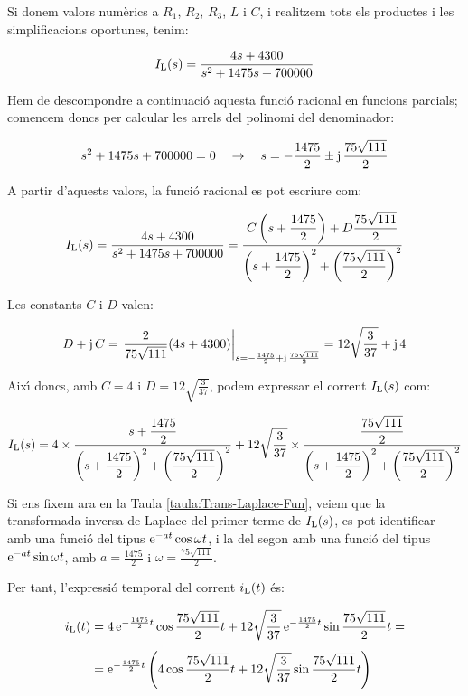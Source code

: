 \begin{exemple}
    Si donem valors num\`{e}rics a $R_1$, $R_2$, $R_3$, $L$ i $C$, i
    realitzem tots els productes i les  simplificacions oportunes,
    tenim:

    \[
    I_\mathrm{L}(s) = \frac{4 s+ 4300}{s^2 +1475 s + 700000}
    \]

    Hem de descompondre a continuaci\'{o} aquesta funci\'{o} racional en
    funcions parcials; comencem doncs per calcular les arrels del
    polinomi del denominador:

    \[
    s^2 +1475 s + 700000 = 0 \quad\rightarrow\quad s= -\frac{1475}{2}
    \pm \mathrm{j}\,\frac{75\sqrt{111}}{2}
    \]

    A partir d'aquests valors, la  funci\'{o} racional es pot escriure com:

    \[
        I_\mathrm{L}(s) =
        \frac{4 s+ 4300}{s^2 +1475 s + 700000} =
        \frac{C\left(s+\dfrac{1475}{2}\right)+D\dfrac{75\sqrt{111}}{2}}
        {\left(s+\dfrac{1475}{2}\right)^2+\left(\dfrac{75\sqrt{111}}{2}\right)^2}
    \]

    Les constants $C$ i $D$ valen:

    \[
    D + \mathrm{j}\,C = \left.\frac{2}{75\sqrt{111}}(4 s
    +4300)\right|_{s=-\frac{1475}{2} + \mathrm{j}\,\frac{75\sqrt{111}}{2}}=
    12\sqrt{\frac{3}{37}} +\mathrm{j}\,4
    \]

    Aix\'{\i} doncs, amb $C=4$ i $D=12\sqrt{\frac{3}{37}}$, podem expressar
    el corrent $I_\mathrm{L}(s)$ com:

    \[
        I_\mathrm{L}(s) = 4\times\frac{s+\dfrac{1475}{2}}
        {\left(s+\dfrac{1475}{2}\right)^2+\left(\dfrac{75\sqrt{111}}{2}\right)^2}
        + 12\sqrt{\frac{3}{37}}\times\frac{\dfrac{75\sqrt{111}}{2}}
        {\left(s+\dfrac{1475}{2}\right)^2+\left(\dfrac{75\sqrt{111}}{2}\right)^2}
    \]


     Si ens fixem ara en la Taula \vref{taula:Trans-Laplace-Fun},
    veiem que la transformada inversa de Laplace del primer terme de
    $I_\mathrm{L}(s)$, es pot identificar amb una funci\'{o} del tipus
    $\mathrm{e}^{-at}\cos\omega t$, i la del segon amb una funci\'{o} del tipus
    $\mathrm{e}^{-at}\sin\omega t$, amb $a=\frac{1475}{2}$ i
    $\omega=\frac{75\sqrt{111}}{2}$.

    Per tant, l'expressi\'{o} temporal del corrent $i_\mathrm{L}(t)$ \'{e}s:

    \[\begin{split}
        i_\mathrm{L}(t) &= 4\, \mathrm{e}^{-\frac{1475}{2}t} \cos \frac{75\sqrt{111}}{2} t +
        12\sqrt{\frac{3}{37}}\, \mathrm{e}^{-\frac{1475}{2}t} \sin
        \frac{75\sqrt{111}}{2}t = \\[1ex] &= \mathrm{e}^{-\frac{1475}{2}t} \left( 4
        \cos \frac{75\sqrt{111}}{2} t + 12\sqrt{\frac{3}{37}}\sin
        \frac{75\sqrt{111}}{2}t\right)
    \end{split}\]


\end{exemple}
